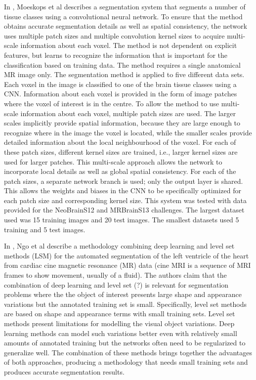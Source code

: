 \documentclass[letterpaper, 10 pt, conference]{ieeeconf}  %
\begin{document}
In \cite{Moeskops_automatic_segmentation}, Moeskops et al describes a segmentation system that segments a number of tissue classes using a convolutional neural network. To ensure that the method obtains accurate segmentation details as well as spatial consistency, the network uses multiple patch sizes and multiple convolution kernel sizes to acquire multi-scale information about each voxel. The method is not dependent on explicit features, but learns to recognize the information that is important for the classification based on training data. The method requires a single anatomical MR image only. The segmentation method is applied to five different data sets. Each voxel in the image is classified to one of the brain tissue classes using a CNN. Information about each voxel is provided in the form of image patches where the voxel of interest is in the centre. To allow the method to use multi-scale information about each voxel, multiple patch sizes are used. The larger scales implicitly provide spatial information, because they are large enough to recognize where in the image the voxel is located, while the smaller scales provide detailed information about the local neighbourhood of the voxel. For each of these patch sizes, different kernel sizes are trained, i.e., larger kernel sizes are used for larger patches. This multi-scale approach allows the network to incorporate local details as well as global spatial consistency. For each of the patch sizes, a separate network branch is used; only the output layer is shared. This allows the weights and biases in the CNN to be specifically optimized for each patch size and corresponding kernel size. This system was tested with data provided for the NeoBrainS12 and MRBrainS13 challenges. The largest dataset used was 15 training images and 20 test images. The smallest datasets used 5 training and 5 test images.

In \cite{NgoLC17_combining}, Ngo et al describe a methodology combining deep learning and level set methods (LSM) for the automated segmentation of the left ventricle of the heart from cardiac cine magnetic resonance (MR) data (cine MRI is a sequence of MRI frames to show movement, usually of a fluid). The authors claim that the combination of deep learning and level set (?)  is relevant for segmentation problems where the the object of interest presents large shape and appearance variations but the annotated training set is small. Specifically, level set methods are based on shape and appearance terms with small training sets. Level set methods present limitations for modelling the visual object variations. Deep learning methods can model such variations better even with relatively small amounts of annotated training but the networks often need to be regularized to generalize well. The combination of these methods brings together the advantages of both approaches, producing a methodology that needs small training sets and produces accurate segmentation results.  
\end{document}
